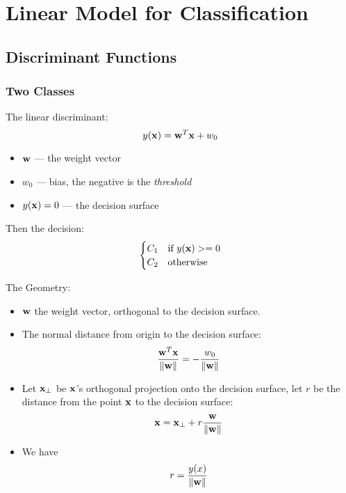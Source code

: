 \chapter{Linear Model for Classification}

\section{Discriminant Functions}
\subsection{Two Classes}
The linear discriminant:
\begin{equation}
    y(\mathbf{x}) = \mathbf{w}^T\mathbf{x} + w_0
    \label{linear_dis}
\end{equation}

\begin{itemize}
    \item $\mathbf{w}$ --- the weight vector
    \item $w_0$ --- bias, the negative is the \emph{threshold}
    \item $y(\mathbf{x}) = 0$ --- the decision surface
\end{itemize}

Then the decision:
\begin{equation}
    \begin{cases}
        C_1 & \text{if } y(\mathbf{x}) >= 0\\
        C_2 & \text{otherwise}
    \end{cases}
\end{equation}

The Geometry:
\begin{itemize}
    \item $\mathbf{w}$ the weight vector, orthogonal to the decision surface.
    \item The normal distance from origin to the decision surface:
        \begin{equation}
            \frac{\mathbf{w}^T \mathbf{x}}{\|\mathbf{w}\|} = -\frac{w_0}{\|\mathbf{w}\|}
        \end{equation}
    \item Let $\mathbf{x}_{\perp}$ be $\mathbf{x}$'s orthogonal projection onto the
        decision surface, let $r$ be the distance from the point $\mathbf{x}$ to
        the decision surface:
        \begin{equation}
            \mathbf{x} = \mathbf{x}_{\perp} + r \frac{\mathbf{w}}{\|\mathbf{w}\|}
        \end{equation}
    \item We have
        \begin{equation}
            r = \frac{y(x)}{\|\mathbf{w}\|}
        \end{equation}
\end{itemize}


